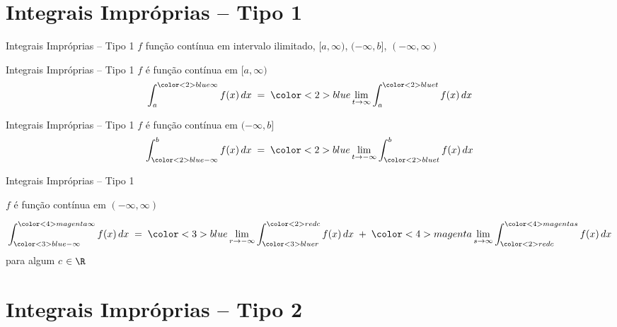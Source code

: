 \section{Integrais Impróprias -- Tipo 1}

\begin{frame}{Integrais Impróprias -- Tipo 1}
  $f$ função contínua em intervalo ilimitado,
  \emph{\([a, \infty)\)},
  \emph{\((-\infty, b]\)},
  \emph{\((-\infty, \infty)\)}
\end{frame}

\begin{frame}{Integrais Impróprias -- Tipo 1}
  $f$ é função contínua em \([a, \infty)\)
  \large
  \[
    \int_a^{{\color<2>{blue} \infty}} f(x) \, dx
    \;=\;  {{\color<2>{blue} \lim_{t\to\infty}}}
    \int_a^{{\color<2>{blue} t}} f(x)  \, dx
  \]
\end{frame}

\begin{frame}{Integrais Impróprias -- Tipo 1}
  $f$ é função contínua em \((-\infty, b]\)
  \large
  \[
    \int_{{\color<2>{blue} -\infty}}^b f(x) \, dx
    \;=\; {\color<2>{blue} \lim_{t\to-\infty}}
    \int_{{\color<2>{blue} t}}^{b} f(x) \,dx
  \]
\end{frame}


\begin{frame}{Integrais Impróprias -- Tipo 1}

  $f$ é função contínua em \((-\infty, \infty)\)

  {\large
  \[
    \int_{{\color<3>{blue}  -\infty}}
        ^{{\color<4>{magenta}\infty}} f(x) \, dx
    \;=\; {\color<3>{blue}   \lim_{r\to-\infty}}
    \int_{{\color<3>{blue}{r}}}
        ^{{\color<2>{red} c}} f(x) \, dx
    \;+\; {\color<4>{magenta}\lim_{s \to \infty}}
    \int_{{\color<2>{red} c}}
        ^{{\color<4>{magenta}s}} f(x) \, dx
  \]}
  para algum { $c$} $\in\R$

\end{frame}

\section{Integrais Impróprias -- Tipo 2}

